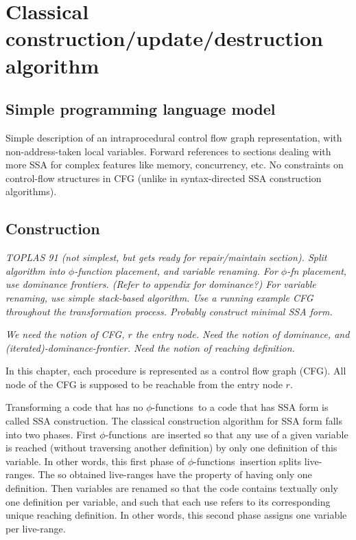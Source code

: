        \chapter{Classical construction/update/destruction algorithm }

\def\phiops{$\phi$-functions}
\def\phiop{$\phi$-function}
\section{Simple programming language model}

Simple description of an intraprocedural control flow graph
representation, with non-address-taken local variables.
Forward references to sections dealing with more SSA for complex
features like memory, concurrency, etc.
No constraints on control-flow structures in CFG
(unlike in syntax-directed SSA construction algorithms).


\section{Construction}
{\em TOPLAS 91 (not simplest, but gets ready for repair/maintain section).
Split algorithm into $\phi$-function placement, and variable
renaming. For $\phi$-fn placement, use dominance frontiers.
(Refer to appendix for dominance?) 
For variable renaming, use simple stack-based algorithm.
Use a running example CFG throughout the transformation process.
Probably construct minimal SSA form.}

{\em We need the notion of CFG, $r$ the entry node. Need the notion of dominance, and (iterated)-dominance-frontier. Need the notion of reaching definition.}

In this chapter, each procedure is represented as a control flow graph (CFG). All node of the CFG is supposed to be reachable from the entry node $r$.

Transforming a code that has no \phiops\ to a code that has SSA form is called SSA construction. The classical construction algorithm for SSA form falls into two phases. 
First \phiops\ are inserted so that any use of a given variable is reached (without traversing another definition) by only one definition of this variable. In other words, this first phase of \phiops\ insertion splits live-ranges. The so obtained live-ranges have the property of having only one definition.
Then variables are renamed so that the code contains textually only one definition per variable, and such that each use refers to its corresponding unique reaching definition. In other words, this second phase assigns one variable per live-range. 

